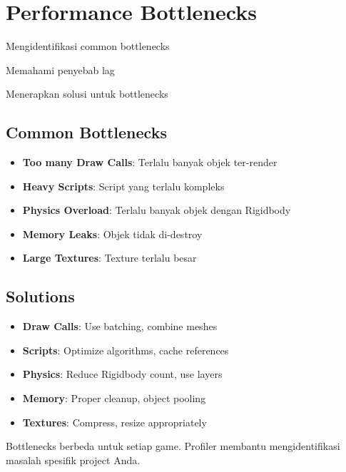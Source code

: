 
\section{Performance Bottlenecks}

\begin{learningoutcomes}
\item Mengidentifikasi common bottlenecks
\item Memahami penyebab lag
\item Menerapkan solusi untuk bottlenecks
\end{learningoutcomes}

\subsection{Common Bottlenecks}

\begin{itemize}
\item \textbf{Too many Draw Calls}: Terlalu banyak objek ter-render
\item \textbf{Heavy Scripts}: Script yang terlalu kompleks
\item \textbf{Physics Overload}: Terlalu banyak objek dengan Rigidbody
\item \textbf{Memory Leaks}: Objek tidak di-destroy
\item \textbf{Large Textures}: Texture terlalu besar
\end{itemize}

\subsection{Solutions}

\begin{itemize}
\item \textbf{Draw Calls}: Use batching, combine meshes
\item \textbf{Scripts}: Optimize algorithms, cache references
\item \textbf{Physics}: Reduce Rigidbody count, use layers
\item \textbf{Memory}: Proper cleanup, object pooling
\item \textbf{Textures}: Compress, resize appropriately
\end{itemize}

\begin{catatan}
Bottlenecks berbeda untuk setiap game. Profiler membantu mengidentifikasi masalah spesifik project Anda.
\end{catatan}

